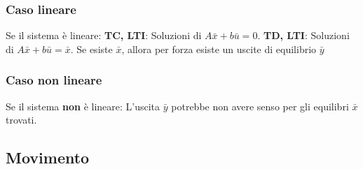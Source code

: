 \begin{landscape}
\begin{multicols*}{3}
    \subsubsection*{Caso lineare}
    Se il sistema è lineare:\newline
    \textbf{TC, LTI}: Soluzioni di $A\bar{x} + b \bar{u} = 0$.\newline
    \textbf{TD, LTI}: Soluzioni di $A\bar{x} + b \bar{u} = \bar{x}$.\newline
    Se esiste $\bar{x}$, allora per forza esiste un uscite di equilibrio $\bar{y}$
    \subsubsection*{Caso non lineare}
    Se il sistema \textbf{non} è lineare:\newline
    L'uscita $\bar{y}$ potrebbe non avere senso per gli equilibri $\bar{x}$ trovati. 
    \subsection*{Movimento}

\end{multicols*}
\end{landscape}
